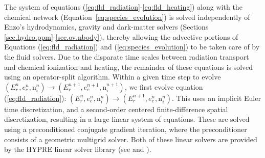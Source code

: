 The system of equations
(\ref{eq:fld_radiation}-\ref{eq:fld_heating}) along with the chemical network 
(Equation~\ref{eq:species_evolution}) is solved
independently of Enzo's hydrodynamics, gravity and dark-matter solvers
(Sections \ref{sec.hydro.ppm}-\ref{sec.ov.nbody}), thereby allowing
the advective portions of Equations (\ref{eq:fld_radiation}) and
(\ref{eq:species_evolution}) to be taken care of by the fluid solvers.
Due to the disparate time scales between radiation transport and chemical
ionization and heating, the remainder of these equations is solved
using an operator-split algorithm.  Within a given time step to evolve
$(E_r^n, e_c^n, {\mathrm n}_i^n) \to (E_r^{n+1}, e_c^{n+1}, {\mathrm
n}_i^{n+1})$, we first evolve equation (\ref{eq:fld_radiation}):
$(E_r^n, e_c^n, {\mathrm n}_i^n) \to (E_r^{n+1}, e_c^{n}, {\mathrm
  n}_i^{n})$.  This uses an implicit Euler time discretization, and a
second-order centered finite-difference spatial discretization,
resulting in a large linear system of equations.  These are solved
using a preconditioned conjugate gradient iteration, where the
preconditioner consists of a geometric multigrid solver.  Both of
these linear solvers are provided by the HYPRE linear solver library
(see \cite{FalgoutYang2002} and \cite{hypre-manual}). 

